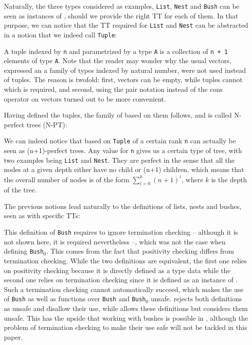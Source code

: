 \documentclass[a4paper,UKenglish,cleveref, autoref, thm-restate]{lipics}
\begin{document}
 Naturally, the three types considered as examples, \texttt{List}, \texttt{Nest} and \texttt{Bush} can be seen as instances of \linear, should we provide the right TT for each of them. In that purpose, we can notice that the TT required for \texttt{List} and \texttt{Nest} can be abstracted in a notion that we indeed call \texttt{Tuple}:

\tuples

A tuple indexed by \texttt{n} and parametrized by a type \texttt{A} is a collection of \texttt{n + 1} elements of type \texttt{A}. Note that the reader may wonder why the usual vectors, expressed an a family of types indexed by natural number, were not used instead of tuples. The reason is twofold: first, vectors can be empty, while tuples cannot which is required, and second, using the pair notation instead of the cons operator on vectors turned out to be more convenient.

 Having defined the tuples, the family of \linears based on them follows, and is called N-perfect trees (N-PT)\cite{nperfecttreesStéphanieWeirich}:

\nary

We can indeed notice that \linears based on \texttt{Tuple} of a certain rank \texttt{n} can actually be seen as (n+1)-perfect trees. Any value for \texttt{n} gives us a certain type of tree, with two examples being \texttt{List} and \texttt{Nest}. They are perfect in the sense that all the nodes at a given depth either have no child or (n+1) children, which means that the overall number of nodes is of the form $\sum\limits_{i=0}^k (n + 1)^i$, where $k$ is the depth of the tree.

 The previous notions lead naturally to the definitions of lists, nests and bushes, seen as \linears with specific TTs:

\lndtdefs

This definition of \texttt{Bush} requires \agda to ignore termination checking -- although it is not shown here, it is required nevertheless --, which was not the case when defining \texttt{Bush$_0$}. This comes from the fact that positivity checking differs from termination checking. While the two definitions are equivalent, the first one relies on positivity checking because it is directly defined as a type data while the second one relies on termination checking since it is defined as an instance of \linear. Such a termination checking cannot automatically succeed, which makes the use of \texttt{Bush} as well as functions over \texttt{Bush} and \texttt{Bush$_0$} unsafe. \coq rejects both definitions as unsafe and disallow their use, while \agda allows these definitions but considers them unsafe. This has the upside that working with bushes is possible in \agda, although the problem of termination checking to make their use safe will not be tackled in this paper.  
\end{document}
